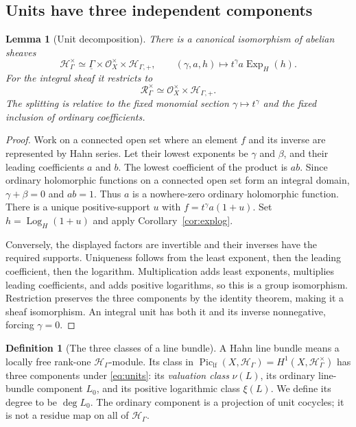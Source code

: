\documentclass[11pt,letterpaper]{article}
\numberwithin{equation}{section}
\newtheorem{lemma}[theorem]{Lemma}
\theoremstyle{definition}
\newtheorem{definition}[theorem]{Definition}
\theoremstyle{remark}
\newcommand{\HH}{\mathcal H}
\newcommand{\RR}{\mathcal R}
\newcommand{\OO}{\mathcal O}
\newcommand{\Piclf}{\operatorname{Pic}_{\mathrm{lf}}}
\newcommand{\Exp}{\operatorname{Exp}_{H}}
\newcommand{\Log}{\operatorname{Log}_{H}}
\newcommand{\Hp}{\HH_{\Gamma,+}}
\newcommand{\Hg}{\HH_\Gamma}
\newcommand{\Rg}{\RR_\Gamma}
\newcommand{\vclass}{\nu}
\begin{document}
\subsection{Units have three independent components}
\begin{lemma}[Unit decomposition]
\label{lem:units}
There is a canonical isomorphism of abelian sheaves
\begin{equation}
 \Hg^\times\simeq\underline\Gamma\times\OO_X^\times\times\Hp,
 \qquad (\gamma,a,h)\longmapsto t^\gamma a\Exp(h).
 \label{eq:units}
\end{equation}
For the integral sheaf it restricts to
\begin{equation}
 \Rg^\times\simeq\OO_X^\times\times\Hp.
 \label{eq:integralunits}
\end{equation}
The splitting is relative to the fixed monomial section $\gamma\mapsto
 t^\gamma$ and the fixed inclusion of ordinary coefficients.
\end{lemma}
\begin{proof}
Work on a connected open set where an element $f$ and its inverse are
represented by Hahn series. Let their lowest exponents be $\gamma$ and
$\beta$, and their leading coefficients $a$ and $b$. The lowest
coefficient of the product is $ab$. Since ordinary holomorphic functions
on a connected open set form an integral domain, $\gamma+\beta=0$
and $ab=1$. Thus $a$ is a nowhere-zero ordinary holomorphic function.
There is a unique positive-support $u$ with
$f=t^\gamma a(1+u)$. Set $h=\Log(1+u)$ and apply
Corollary~\ref{cor:explog}.

Conversely, the displayed factors are invertible and their inverses
have the required supports. Uniqueness follows from the least exponent,
then the leading coefficient, then the logarithm. Multiplication adds
least exponents, multiplies leading coefficients, and adds positive
logarithms, so this is a group isomorphism. Restriction preserves the
three components by the identity theorem, making it a sheaf isomorphism.
An integral unit has both it and its inverse nonnegative, forcing
$\gamma=0$.
\end{proof}

\begin{definition}[The three classes of a line bundle]
A Hahn line bundle means a locally free rank-one $\Hg$-module. Its class
in $\Piclf(X,\Hg)=H^1(X,\Hg^\times)$ has three components under
\eqref{eq:units}: its \emph{valuation class} $\vclass(L)$, its ordinary
line-bundle component $L_0$, and its positive logarithmic class $\xi(L)$.
We define its degree to be $\deg L_0$. The ordinary component is a
projection of unit cocycles; it is not a residue map on all of $\Hg$.
\end{definition}
\end{document}
